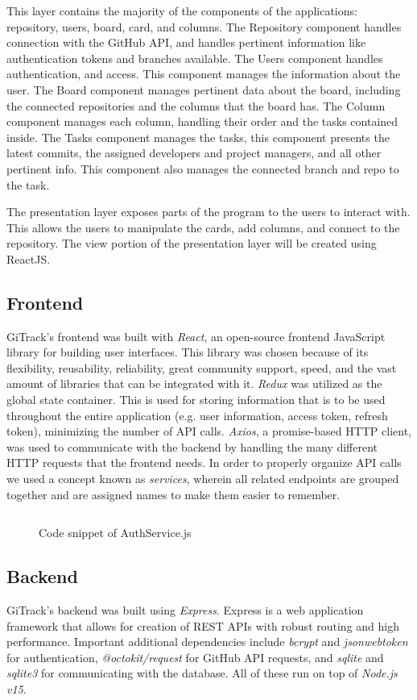 \documentclass{article}
\newcommand{\js}[1]{\inputminted{javascript}{samples/js/#1.js}}
\begin{document}
This layer contains the majority of the components of the applications:
repository, users, board, card, and columns. The Repository component handles
connection with the GitHub API, and handles pertinent information like
authentication tokens and branches available. The Users component handles
authentication, and access. This component manages the information about the
user. The Board component manages pertinent data about the board, including the
connected repositories and the columns that the board has. The Column component
manages each column, handling their order and the tasks contained inside. The
Tasks component manages the tasks, this component presents the latest commits,
the assigned developers and project managers, and all other pertinent info. This
component also manages the connected branch and repo to the task.

The presentation layer exposes parts of the program to the users to interact
with. This allows the users to manipulate the cards, add columns, and connect to
the repository. The view portion of the presentation layer will be created using
ReactJS.

\subsection{Frontend}
GiTrack’s frontend was built with \emph{React}, an open-source frontend
JavaScript library for building user interfaces. This library was chosen because
of its flexibility, reusability, reliability, great community support, speed,
and the vast amount of libraries that can be integrated with it. \emph{Redux}
was utilized as the global state container. This is used for storing information
that is to be used throughout the entire application (e.g. user information,
access token, refresh token), minimizing the number of API calls. \emph{Axios},
a promise-based HTTP client, was used to communicate with the backend by
handling the many different HTTP requests that the frontend needs. In order to
properly organize API calls we used a concept known as \emph{services}, wherein
all related endpoints are grouped together and are assigned names to make them
easier to remember.

\begin{figure}[H]
	\js{authservice}
	\caption{Code snippet of AuthService.js}
	\label{fig:authservice}
\end{figure}

\subsection{Backend}
GiTrack’s backend was built using \emph{Express}. Express is a web application
framework that allows for creation of REST APIs with robust routing and high
performance. Important additional dependencies include \emph{bcrypt} and
\emph{jsonwebtoken} for authentication, \emph{@octokit/request} for GitHub API
requests, and \emph{sqlite} and \emph{sqlite3} for communicating with the
database. All of these run on top of \emph{Node.js v15}.
\end{document}
